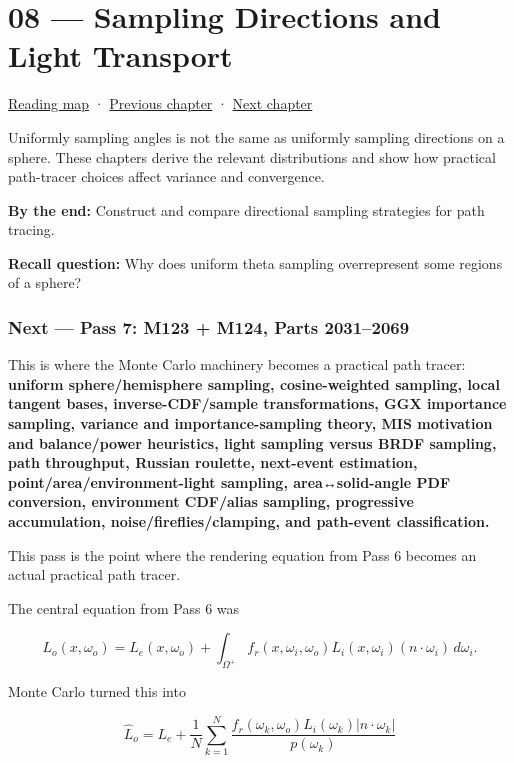 \hypertarget{03-visual-computing-i-ch008}{}
\section{08 --- Sampling Directions and Light Transport}\label{sampling-directions-and-light-transport}

\href{Chapter\%20Edition/02\%20-\%20Graphics\%20Vision\%20and\%20XR/00\%20-\%20Reading\%20Map}{Reading map} · \hyperref[03-visual-computing-i-ch007]{Previous chapter} · \hyperref[03-visual-computing-i-ch009]{Next chapter}

Uniformly sampling angles is not the same as uniformly sampling directions on a sphere. These chapters derive the relevant distributions and show how practical path-tracer choices affect variance and convergence.

\textbf{By the end:} Construct and compare directional sampling strategies for path tracing.

\textbf{Recall question:} Why does uniform theta sampling overrepresent some regions of a sphere?

\subsubsection{Next --- Pass 7: M123 + M124, Parts 2031--2069}\label{next-pass-7-m123-m124-parts-20312069}

This is where the Monte Carlo machinery becomes a practical path tracer: \textbf{uniform sphere/hemisphere sampling, cosine-weighted sampling, local tangent bases, inverse-CDF/sample transformations, GGX importance sampling, variance and importance-sampling theory, MIS motivation and balance/power heuristics, light sampling versus BRDF sampling, path throughput, Russian roulette, next-event estimation, point/area/environment-light sampling, area↔solid-angle PDF conversion, environment CDF/alias sampling, progressive accumulation, noise/fireflies/clamping, and path-event classification.}

This pass is the point where the rendering equation from Pass 6 becomes an actual practical path tracer.

The central equation from Pass 6 was

\[
L_o(x,\omega_o)
=
L_e(x,\omega_o)
+
\int_{\Omega^+}
f_r(x,\omega_i,\omega_o)
L_i(x,\omega_i)
\left(n\cdot\omega_i\right)
\,d\omega_i.
\]

Monte Carlo turned this into

\[
\boxed{
\hat L_o
=
L_e+
\frac{1}{N}
\sum_{k=1}^{N}
\frac{
f_r(\omega_k,\omega_o)
L_i(\omega_k)
|n\cdot\omega_k|
}{
p(\omega_k)
}
}
\]

